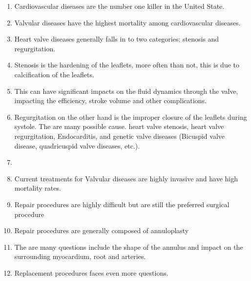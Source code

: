     
\begin{enumerate}
\item Cardiovascular diseases are the number one killer in the United State. 
\item Valvular diseases have the highest mortality among cardiovascular diseases. 
\item Heart valve diseases generally falls in to two categories: stenosis and regurgitation. 
\item Stenosis is the hardening of the leaflets, more often than not, this is due to calcification of the leaflets. 
\item This can have significant impacts on the fluid dynamics through the valve, impacting the efficiency, stroke volume and other complications. 
\item Regurgitation on the other hand is the improper closure of the leaflets during systole. The are many possible cause. heart valve stenosis, heart valve regurgitation, Endocarditis, and genetic valve diseases (Bicuspid valve disease, quadricuspid valve diseases, etc.). 
\item 
\item Current treatments for Valvular diseases are highly invasive and have high mortality rates. 
\item Repair procedures are highly difficult but are still the preferred surgical procedure
\item Repair procedures are generally composed of annuloplasty 
\item The are many questions include the shape of the annulus and impact on the surrounding myocardium, root and arteries. 
\item Replacement procedures faces even more questions.




\end{enumerate}